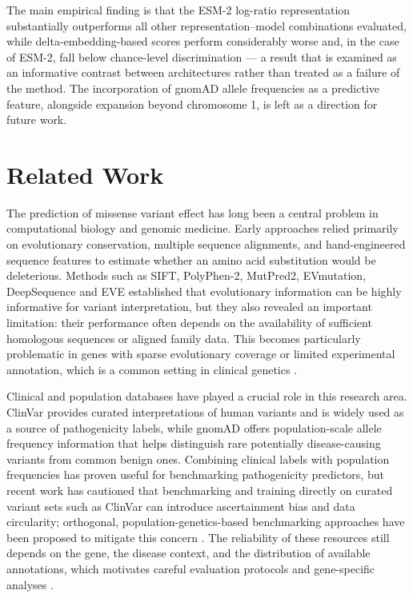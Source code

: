 \documentclass[12pt]{article}
\begin{document}
The main empirical finding is that the ESM-2 log-ratio representation substantially outperforms all other representation--model combinations evaluated, while delta-embedding-based scores perform considerably worse and, in the case of ESM-2, fall below chance-level discrimination --- a result that is examined as an informative contrast between architectures rather than treated as a failure of the method. The incorporation of gnomAD allele frequencies as a predictive feature, alongside expansion beyond chromosome 1, is left as a direction for future work.

\section{Related Work}

The prediction of missense variant effect has long been a central problem in computational biology and genomic medicine. Early approaches relied primarily on evolutionary conservation, multiple sequence alignments, and hand-engineered sequence features to estimate whether an amino acid substitution would be deleterious. Methods such as SIFT, PolyPhen-2, MutPred2, EVmutation, DeepSequence and EVE established that evolutionary information can be highly informative for variant interpretation, but they also revealed an important limitation: their performance often depends on the availability of sufficient homologous sequences or aligned family data. This becomes particularly problematic in genes with sparse evolutionary coverage or limited experimental annotation, which is a common setting in clinical genetics \cite{liu}.

Clinical and population databases have played a crucial role in this research area. ClinVar provides curated interpretations of human variants and is widely used as a source of pathogenicity labels, while gnomAD offers population-scale allele frequency information that helps distinguish rare potentially disease-causing variants from common benign ones. Combining clinical labels with population frequencies has proven useful for benchmarking pathogenicity predictors, but recent work has cautioned that benchmarking and training directly on curated variant sets such as ClinVar can introduce ascertainment bias and data circularity; orthogonal, population-genetics-based benchmarking approaches have been proposed to mitigate this concern \cite{mikhail}. The reliability of these resources still depends on the gene, the disease context, and the distribution of available annotations, which motivates careful evaluation protocols and gene-specific analyses \cite{clinvar}.
\end{document}
